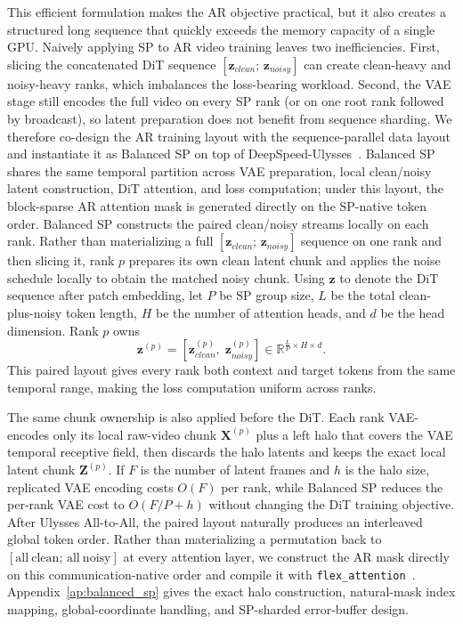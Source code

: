 This efficient formulation makes the AR objective practical, but it also creates a structured long sequence that quickly exceeds the memory capacity of a single GPU.
Naively applying SP to AR video training leaves two inefficiencies.
First, slicing the concatenated DiT sequence $[\mathbf{z}_{clean};\,\mathbf{z}_{noisy}]$ can create clean-heavy and noisy-heavy ranks, which imbalances the loss-bearing workload.
Second, the VAE stage still encodes the full video on every SP rank (or on one root rank followed by broadcast), so latent preparation does not benefit from sequence sharding.
We therefore co-design the AR training layout with the sequence-parallel data layout and instantiate it as Balanced SP on top of DeepSpeed-Ulysses~\cite{jacobs2023deepspeed}.
Balanced SP shares the same temporal partition across VAE preparation, local clean/noisy latent construction, DiT attention, and loss computation; under this layout, the block-sparse AR attention mask is generated directly on the SP-native token order.
Balanced SP constructs the paired clean/noisy streams locally on each rank.
Rather than materializing a full $[\mathbf{z}_{clean};\,\mathbf{z}_{noisy}]$ sequence on one rank and then slicing it, rank $p$ prepares its own clean latent chunk and applies the noise schedule locally to obtain the matched noisy chunk.
Using $\mathbf{z}$ to denote the DiT sequence after patch embedding, let $P$ be SP group size, $L$ be the total clean-plus-noisy token length, $H$ be the number of attention heads, and $d$ be the head dimension. Rank $p$ owns
\begin{equation}
    \mathbf{z}^{(p)} = \left[\mathbf{z}_{clean}^{(p)},\;
    \mathbf{z}_{noisy}^{(p)}\right]
    \in \mathbb{R}^{\frac{L}{P} \times H \times d}.
\end{equation}
This paired layout gives every rank both context and target tokens from the same temporal range, making the loss computation uniform across ranks.

The same chunk ownership is also applied before the DiT.
Each rank VAE-encodes only its local raw-video chunk $\mathbf{X}^{(p)}$ plus a left halo that covers the VAE temporal receptive field, then discards the halo latents and keeps the exact local latent chunk $\mathbf{Z}^{(p)}$.
If $F$ is the number of latent frames and $h$ is the halo size, replicated VAE encoding costs $O(F)$ per rank, while Balanced SP reduces the per-rank VAE cost to $O(F/P+h)$ without changing the DiT training objective.
After Ulysses All-to-All, the paired layout naturally produces an interleaved global token order.
Rather than materializing a permutation back to $[\mathrm{all\ clean};\,\mathrm{all\ noisy}]$ at every attention layer, we construct the AR mask directly on this communication-native order and compile it with \texttt{flex\_attention}~\cite{dong2024flex}.
Appendix~\ref{ap:balanced_sp} gives the exact halo construction, natural-mask index mapping, global-coordinate handling, and SP-sharded error-buffer design.

